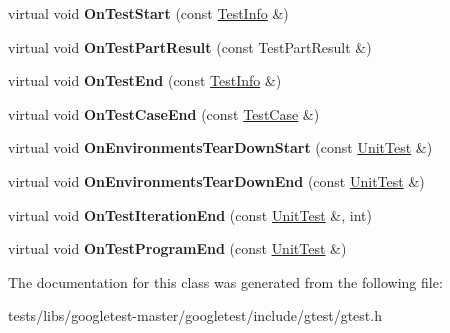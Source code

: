 \begin{DoxyCompactItemize}
\item 
\mbox{\label{classtesting_1_1EmptyTestEventListener_a84fa74cc9ba742f9f847ea405ca84e5e}} 
virtual void {\bfseries On\+Test\+Start} (const \hyperlink{classtesting_1_1TestInfo}{Test\+Info} \&)
\item 
\mbox{\label{classtesting_1_1EmptyTestEventListener_a59e7f7d9f2e2d089a6e8c1e2577f4718}} 
virtual void {\bfseries On\+Test\+Part\+Result} (const Test\+Part\+Result \&)
\item 
\mbox{\label{classtesting_1_1EmptyTestEventListener_afd58d21005f0d0d0399fb114627545d3}} 
virtual void {\bfseries On\+Test\+End} (const \hyperlink{classtesting_1_1TestInfo}{Test\+Info} \&)
\item 
\mbox{\label{classtesting_1_1EmptyTestEventListener_a6bec703158283104c4298f7d8a528515}} 
virtual void {\bfseries On\+Test\+Case\+End} (const \hyperlink{classtesting_1_1TestCase}{Test\+Case} \&)
\item 
\mbox{\label{classtesting_1_1EmptyTestEventListener_a00fa1a4ea5831e20746188414268e7c6}} 
virtual void {\bfseries On\+Environments\+Tear\+Down\+Start} (const \hyperlink{classtesting_1_1UnitTest}{Unit\+Test} \&)
\item 
\mbox{\label{classtesting_1_1EmptyTestEventListener_aea64c83c415b33a4c0b0239bafd1438d}} 
virtual void {\bfseries On\+Environments\+Tear\+Down\+End} (const \hyperlink{classtesting_1_1UnitTest}{Unit\+Test} \&)
\item 
\mbox{\label{classtesting_1_1EmptyTestEventListener_a2253e5a18b3cf7bccd349567a252209d}} 
virtual void {\bfseries On\+Test\+Iteration\+End} (const \hyperlink{classtesting_1_1UnitTest}{Unit\+Test} \&, int)
\item 
\mbox{\label{classtesting_1_1EmptyTestEventListener_a0abcc02bd2331a2e29ad6f4d9daf2a32}} 
virtual void {\bfseries On\+Test\+Program\+End} (const \hyperlink{classtesting_1_1UnitTest}{Unit\+Test} \&)
\end{DoxyCompactItemize}


The documentation for this class was generated from the following file\+:\begin{DoxyCompactItemize}
\item 
tests/libs/googletest-\/master/googletest/include/gtest/gtest.\+h\end{DoxyCompactItemize}
